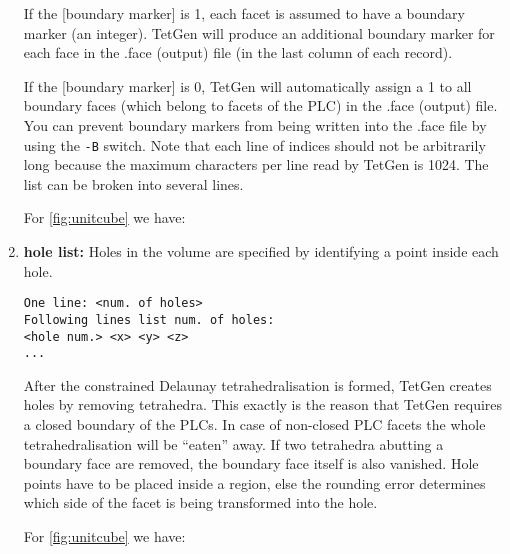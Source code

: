 \documentclass[12pt,twoside,a4paper]{article}
\numberwithin{equation}{section}
\newcommand{\tetB}{\texttt{-B}}
\begin{document}
\begin{enumerate}
If the [boundary marker] is 1, each facet is assumed to have a boundary
marker (an integer). TetGen will produce an additional boundary marker for
each face in the .face (output) file (in the last column of each record).  

If the [boundary marker] is 0, TetGen will automatically assign a 1 to all
boundary faces (which belong to facets of the PLC) in the .face (output)
file.  You can prevent boundary markers from being written into the .face
file by using the \tetB{} switch.  Note that each line of indices should not
be arbitrarily long because the maximum characters per line read by TetGen
is 1024. The list can be broken into several lines.


For \cref{fig:unitcube} we have:

                {\cubepolyfile}

\item \textbf{hole list:} 
  Holes in the volume are specified by identifying a point inside each hole.
\begin{lstlisting}[style=raycodetetgenpoly,numbers=none]
One line: <num. of holes>
Following lines list num. of holes:
<hole num.> <x> <y> <z>
...
\end{lstlisting} 
After the constrained Delaunay tetrahedralisation is formed, TetGen creates
holes by removing tetrahedra. This exactly is the reason that TetGen
requires a closed boundary of the PLCs. In case of non-closed PLC facets the
whole tetrahedralisation will be “eaten” away. If two tetrahedra abutting a
boundary face are removed, the boundary face itself is also vanished.  Hole
points have to be placed inside a region, else the rounding error determines
which side of the facet is being transformed into the hole.


For \cref{fig:unitcube} we have:

                {\cubepolyfile}


\end{enumerate}
\end{document}
